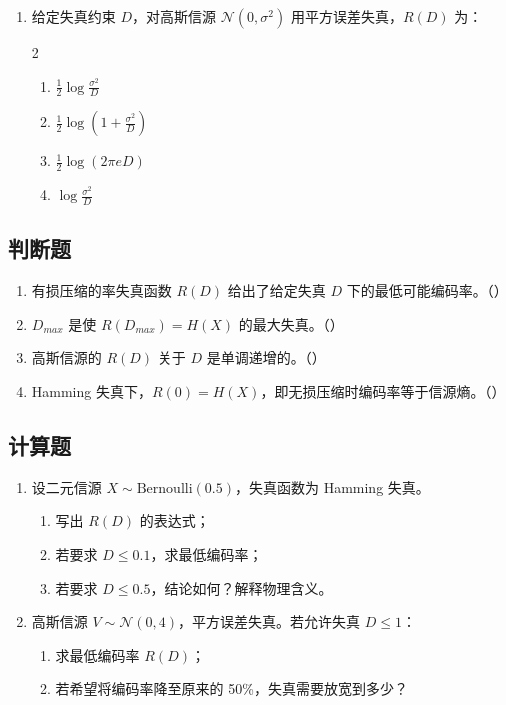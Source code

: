 \documentclass[12pt,a4paper]{ctexart}
\begin{document}
\begin{enumerate}[label=\arabic*., leftmargin=*]
\item 给定失真约束 $D$，对高斯信源 $\mathcal{N}(0,\sigma^2)$ 用平方误差失真，$R(D)$ 为：
\begin{multicols}{2}
\begin{enumerate}[label=(\Alph*)]
  \item $\frac{1}{2}\log\frac{\sigma^2}{D}$
  \item $\frac{1}{2}\log(1+\frac{\sigma^2}{D})$
  \item $\frac{1}{2}\log(2\pi e D)$
  \item $\log\frac{\sigma^2}{D}$
\end{enumerate}
\end{multicols}

\end{enumerate}

\subsection*{判断题}

\begin{enumerate}[label=\arabic*., leftmargin=*]
\item 有损压缩的率失真函数 $R(D)$ 给出了给定失真 $D$ 下的最低可能编码率。（\quad）
\item $D_{max}$ 是使 $R(D_{max})=H(X)$ 的最大失真。（\quad）
\item 高斯信源的 $R(D)$ 关于 $D$ 是单调递增的。（\quad）
\item Hamming 失真下，$R(0) = H(X)$，即无损压缩时编码率等于信源熵。（\quad）
\end{enumerate}

\subsection*{计算题}

\begin{enumerate}[label=\textbf{\arabic*.}, leftmargin=*]
\item 设二元信源 $X \sim \mathrm{Bernoulli}(0.5)$，失真函数为 Hamming 失真。
\begin{enumerate}
  \item 写出 $R(D)$ 的表达式；
  \item 若要求 $D \leq 0.1$，求最低编码率；
  \item 若要求 $D \leq 0.5$，结论如何？解释物理含义。
\end{enumerate}

\item 高斯信源 $V \sim \mathcal{N}(0,4)$，平方误差失真。若允许失真 $D \leq 1$：
\begin{enumerate}
  \item 求最低编码率 $R(D)$；
  \item 若希望将编码率降至原来的 50\%，失真需要放宽到多少？
\end{enumerate}
\end{enumerate}
\end{document}
